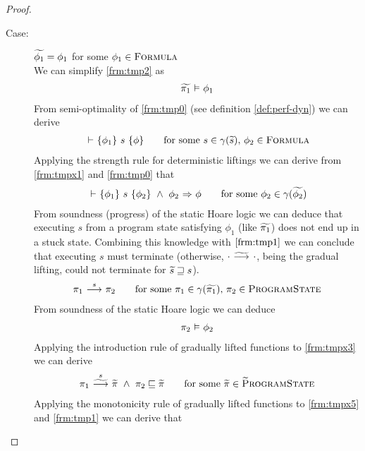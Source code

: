 \begin{proof}
    \begin{description}
        \item[Case:] $\widetilde{\phi_1} = \phi_1$ for some $\phi_1 \in \textup{\textsc{Formula}}$~\\
        We can simplify \ref{frm:tmp2} as
        \begin{align}
        \label{frm:tmpx0}
        \evalphiGen{\grad{\pi_1}}{\phi_1}
        \end{align}
        From semi-optimality of \ref{frm:tmp0} (see definition \ref{def:perf-dyn}) we can derive
        \begin{align}
        \label{frm:tmpx1}
        \thoare{}{\phi_1}{s}{\phi}
        \quad\quad\text{for some } s \in \gamma(\grad{s}),\, \phi_2 \in \setFormula
        \end{align}
        Applying the strength rule for deterministic liftings we can derive from \ref{frm:tmpx1} and \ref{frm:tmp0} that
        \begin{align}
        \label{frm:tmpx2}
        \thoare{}{\phi_1}{s}{\phi_2} ~\wedge~ \phiImplies{\phi_2}{\phi}
        \quad\quad\text{for some } \phi_2 \in \gamma(\grad{\phi_2})
        \end{align}
        From soundness (progress) of the static Hoare logic we can deduce that executing $s$ from a program state satisfying $\phi_1$ (like $\widetilde{\pi_1}$) does not end up in a stuck state.
        Combining this knowledge with $\ref{frm:tmp1}$ we can conclude that executing $s$ must terminate (otherwise, ${\cdot} \,\,{\widetilde{\longrightarrow}^{}}\,\, {\cdot}$, being the gradual lifting, could not terminate for $\widetilde{s} \sqsupseteq s$).
        \begin{align}
        \label{frm:tmpx3}
        \sstepConsume{s}{\pi_1}{\pi_2}
        \quad\quad\text{for some } \pi_1 \in \gamma(\grad{\pi_1}),\, \pi_2 \in \setProgramState
        \end{align}
        From soundness of the static Hoare logic we can deduce
        \begin{align}
        \label{frm:tmpx4}
        \evalphiGen{\pi_2}{\phi_2}
        \end{align}
        Applying the introduction rule of gradually lifted functions to \ref{frm:tmpx3} we can derive
        \begin{align}
        \label{frm:tmpx5}
        \gsstepConsume{s}{\pi_1}{\grad{\pi}} ~\wedge~ \pi_2 \sqsubseteq \grad{\pi}
        \quad\quad\text{for some } \grad{\pi} \in \setGProgramState
        \end{align}
        Applying the monotonicity rule of gradually lifted functions to \ref{frm:tmpx5} and \ref{frm:tmp1} we can derive that

\end{description}
\end{proof}
